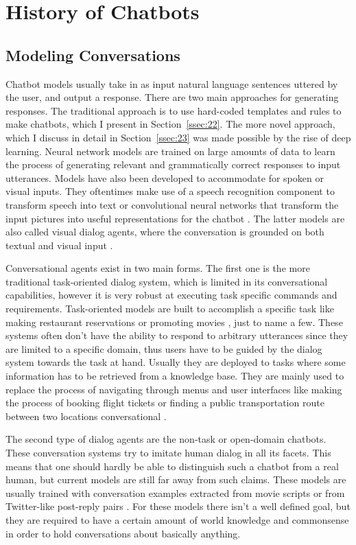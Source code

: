 \documentclass[12pt]{article}
\begin{document}
\newpage\section{History of Chatbots} \label{sec:history}

\subsection{Modeling Conversations} \label{ssec:21}
Chatbot models usually take in as input natural language sentences uttered by the user, and output a response. There are two main approaches for generating responses. The traditional approach is to use hard-coded templates and rules to make chatbots, which I present in Section~\ref{ssec:22}. The more novel approach, which I discuss in detail in Section~\ref{ssec:23} was made possible by the rise of deep learning. Neural network models are trained on large amounts of data to learn the process of generating relevant and grammatically correct responses to input utterances. Models have also been developed to accommodate for spoken or visual inputs. They oftentimes make use of a speech recognition component to transform speech into text \cite{Serban:2017} or convolutional neural networks that transform the input pictures into useful representations for the chatbot \cite{Havrylov:2017}. The latter models are also called visual dialog agents, where the conversation is grounded on both textual and visual input \cite{Das:2017}.

Conversational agents exist in two main forms. The first one is the more traditional task-oriented dialog system, which is limited in its conversational capabilities, however it is very robust at executing task specific commands and requirements. Task-oriented models are built to accomplish a specific task like making restaurant reservations \cite{Joshi:2017,Bordes:2016} or promoting movies \cite{Yu:2017}, just to name a few. These systems often don't have the ability to respond to arbitrary utterances since they are limited to a specific domain, thus users have to be guided by the dialog system towards the task at hand. Usually they are deployed to tasks where some information has to be retrieved from a knowledge base. They are mainly used to replace the process of navigating through menus and user interfaces like making the process of booking flight tickets or finding a public transportation route between two locations conversational \cite{Zhao:2017}.  

The second type of dialog agents are the non-task or open-domain chatbots. These conversation systems try to imitate human dialog in all its facets. This means that one should hardly be able to distinguish such a chatbot from a real human, but current models are still far away from such claims. These models are usually trained with conversation examples extracted from movie scripts or from Twitter-like post-reply pairs \cite{Vinyals:2015,Shang:2015,Serban:2015,Li:2016}. For these models there isn't a well defined goal, but they are required to have a certain amount of world knowledge and commonsense in order to hold conversations about basically anything.
\end{document}
